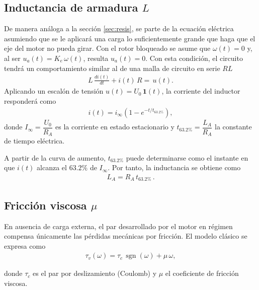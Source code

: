     \subsection{Inductancia de armadura $L$}
        De manera análoga a la sección \ref{sec:resis}, se parte de la ecuación eléctrica asumiendo que se le aplicará una carga lo suficientemente grande que haga que el eje del motor no pueda girar. Con el rotor bloqueado se asume que $\omega(t)=0$ y, al ser $u_a(t)=K_e\,\omega(t)$, resulta $u_a(t)=0$. Con esta condición, el circuito tendrá un comportamiento similar al de una malla de circuito en serie $RL$
        \begin{align}
        L\,\frac{di(t)}{dt}+i(t)\,R=\,u(t). 
        \end{align}
        Aplicando un escalón de tensión $u(t)=U_0\,\mathbf{1}(t)$, la corriente del inductor responderá como
        \begin{align}
        i(t)=i_\infty\left(1-e^{-t/t_{63.2\%}}\right),
        \end{align}
        donde $I_\infty=\dfrac{U_0}{R_A}$ es la corriente en estado estacionario y $t_{63.2\%}=\dfrac{L_A}{R_A}$ la constante de tiempo eléctrica.
        
        A partir de la curva de aumento, $t_{63.2\%}$ puede determinarse como el instante en que $i(t)$ alcanza el $63.2\%$ de $I_\infty$. Por tanto, la inductancia se obtiene como        
        \begin{align}
        L_A=R_A\,t_{63.2\%}\,.
        \end{align}
        
    \subsection{Fricción viscosa $\mu$}
        En ausencia de carga externa, el par desarrollado por el motor en régimen compensa únicamente las pérdidas mecánicas por fricción. El modelo clásico se
        expresa como
        \begin{align*}
            \tau_v(\omega)=\tau_c\,\operatorname{sgn}(\omega)+\mu\,\omega,
            \label{eq:ecu_fric}
        \end{align*}
        
        donde $\tau_c$ es el par por deslizamiento (Coulomb) y $\mu$ el coeficiente de
        fricción viscosa.
        
